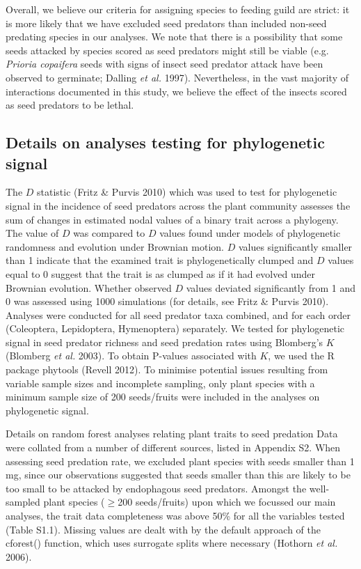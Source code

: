 \documentclass[11pt]{article}
\begin{document}
Overall, we believe our criteria for assigning species to feeding guild are strict: it is more likely that we have excluded seed predators than included non-seed predating species in our analyses. We note that there is a possibility that some seeds attacked by species scored as seed predators might still be viable (e.g. \emph{Prioria copaifera} seeds with signs of insect seed predator attack have been observed to germinate; Dalling \emph{et al. }1997). Nevertheless, in the vast majority of interactions documented in this study, we believe the effect of the insects scored as seed predators to be lethal. 

\subsection*{Details on analyses testing for phylogenetic signal}

The $D$ statistic (Fritz \& Purvis 2010) which was used to test for phylogenetic signal in the incidence of seed predators across the plant community assesses the sum of changes in estimated nodal values of a binary trait across a phylogeny. The value of $D$ was compared to $D$ values found under models of phylogenetic randomness and evolution under Brownian motion. $D$ values significantly smaller than 1 indicate that the examined trait is phylogenetically clumped and $D$ values equal to 0 suggest that the trait is as clumped as if it had evolved under Brownian evolution. Whether observed $D$ values deviated significantly from 1 and 0 was assessed using 1000 simulations (for details, see Fritz \& Purvis 2010). Analyses were conducted for all seed predator taxa combined, and for each order (Coleoptera, Lepidoptera, Hymenoptera) separately.
We tested for phylogenetic signal in seed predator richness and seed predation rates using Blomberg’s $K$ (Blomberg \emph{et al. }2003). To obtain P-values associated with $K$, we used the R package phytools (Revell 2012). To minimise potential issues resulting from variable sample sizes and incomplete sampling, only plant species with a minimum sample size of 200 seeds/fruits were included in the analyses on phylogenetic signal.

Details on random forest analyses relating plant traits to seed predation
Data were collated from a number of different sources, listed in Appendix S2. When assessing seed predation rate, we excluded plant species with seeds smaller than 1 mg, since our observations suggested that seeds smaller than this are likely to be too small to be attacked by endophagous seed predators. Amongst the well-sampled plant species ($\geq$200 seeds/fruits) upon which we focussed our main analyses, the trait data completeness was above 50\% for all the variables tested (Table S1.1). Missing values are dealt with by the default approach of the cforest() function, which uses surrogate splits where necessary (Hothorn \emph{et al. }2006). 
\end{document}
